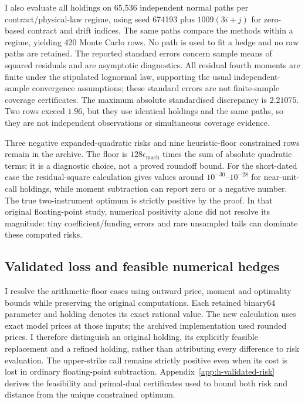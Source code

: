 \documentclass[11pt]{article}
\begin{document}
I also evaluate all holdings on 65,536 independent normal paths per
contract/physical-law regime, using seed 674193 plus
$1009(3i+j)$ for zero-based contract and drift indices.
The same paths compare the methods within a regime, yielding 420
Monte Carlo rows. No path is used to fit a hedge and no raw paths
are retained. The reported standard errors concern sample means of
squared residuals and are asymptotic diagnostics. All residual fourth
moments are finite under the stipulated lognormal law, supporting
the usual independent-sample convergence assumptions; these standard
errors are not finite-sample coverage certificates.
The maximum absolute standardised discrepancy is $2.21075$.
Two rows exceed $1.96$, but they use identical holdings and the same
paths, so they are not independent observations or simultaneous
coverage evidence.

Three negative expanded-quadratic risks and nine heuristic-floor
constrained rows remain in the archive. The floor is
$128\epsilon_{\mathrm{mach}}$ times the sum of absolute quadratic
terms; it is a diagnostic choice, not a proved roundoff bound.
For the short-dated case the residual-square calculation gives values
around $10^{-30}$--$10^{-28}$ for near-unit-call holdings, while
moment subtraction can report zero or a negative number.
The true two-instrument optimum is strictly positive by the proof.
In that original floating-point study, numerical positivity alone did not resolve its magnitude: tiny
coefficient/funding errors and rare unsampled tails can dominate
these computed risks.

\subsection{Validated loss and feasible numerical hedges}
\label{sec:h-validated-risk}

I resolve the arithmetic-floor cases using outward price, moment and
optimality bounds while preserving the original computations.
Each retained binary64 parameter and holding denotes its exact rational
value. The new calculation uses exact model prices at those inputs;
the archived implementation used rounded prices. I therefore distinguish
an original holding, its explicitly feasible replacement and a refined
holding, rather than attributing every difference to risk evaluation.
The upper-strike call remains strictly positive even when its cost is
lost in ordinary floating-point subtraction. Appendix~\ref{app:h-validated-risk}
derives the feasibility and primal-dual certificates used to bound both
risk and distance from the unique constrained optimum.
\end{document}
